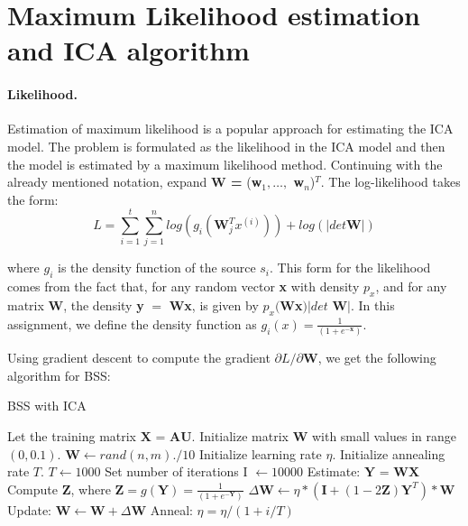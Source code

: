 \documentclass[11pt]{article}
\begin{document}
\section{Maximum Likelihood estimation and ICA algorithm}
\paragraph{Likelihood.}
 Estimation of maximum likelihood is a popular approach for estimating the ICA model. The problem is formulated as the likelihood in the ICA model and then the model is estimated by a maximum likelihood method. Continuing with the already mentioned notation, expand \textbf{W = } (\textbf{w$_1, \ldots,$ w$_n$})$^T$. The log-likelihood takes the form:
\begin{equation}
	L = \displaystyle\sum_{i=1}^{t} \displaystyle\sum_{j=1}^{n} log\left( g_i(\textbf{W}_j^{T} x^{(i)}) \right) + log( |{det}\textbf{W}| )
\end{equation}

where $g_i$ is the density function of the source $s_i$. This form for the likelihood comes from the fact that, for any random vector \textbf{x} with density $p_x$, and for any matrix \textbf{W}, the density \textbf{y} $=$ \textbf{Wx}, is given by $p_x($\textbf{Wx}$)|det $ \textbf{W}$|$. In this assignment, we define the density function as $g_i(x) = \frac{1}{(1+e^{-\textbf{x}})}$. 

Using gradient descent to compute the gradient $\partial L / \partial \textbf{W}$, we get the following algorithm for BSS:
\begin{algorithm}
\caption{BSS with ICA}
\label{icaalgo}
\begin{algorithmic}[1]
  \State Let the training matrix $\textbf{X = AU}$.
  \State Initialize matrix \textbf{W} with small values in range $(0,0.1)$. $ \textbf{W} \gets rand(n, m) ./ 10$
  \State Initialize learning rate $\eta$.
  \State Initialize annealing rate $T$. $T \gets 1000$
  \State Set number of iterations I $ \gets 10000$
  	\State Estimate: $\textbf{Y = WX}$
  	\State Compute \textbf{Z}, where $\textbf{Z} = g(\textbf{Y}) = \frac{1}{(1+e^{-\textbf{Y}})}$ 
  	\State $\Delta \textbf{W} \gets \eta * (\textbf{I} + (1-2\textbf{Z})\textbf{Y}^{T}) * \textbf{W}$
  	\State Update: $\textbf{W} \gets \textbf{W} + \Delta \textbf{W}$ 
	\State Anneal: $\eta = \eta / (1 + i/T) $
  \EndFor
\end{algorithmic}
\end{algorithm}
\end{document}
